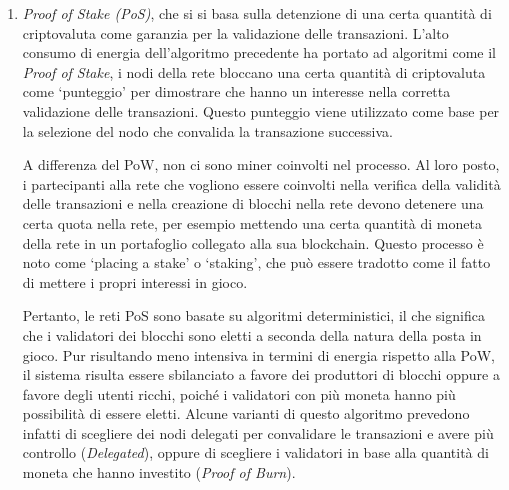 \begin{enumerate}
    \item\textit{{Proof of Stake (PoS)}}, che si si basa sulla detenzione di una certa quantità di criptovaluta come garanzia per la validazione delle transazioni. 
    L'alto consumo di energia dell'algoritmo precedente ha portato ad algoritmi come il \textit{Proof of Stake}, i nodi della rete bloccano una certa quantità di criptovaluta come `punteggio'
    per dimostrare che hanno un interesse nella corretta validazione delle transazioni. 
    Questo punteggio viene utilizzato come base per la selezione del nodo che convalida la transazione successiva. 
    
    A differenza del PoW, non ci sono miner coinvolti nel processo. Al loro posto, i partecipanti alla rete che 
    vogliono essere coinvolti nella verifica della validità delle transazioni e nella creazione di blocchi nella rete 
    devono detenere una certa quota nella rete, per esempio mettendo una certa quantità di moneta della rete in un portafoglio collegato 
    alla sua blockchain. Questo processo è noto come `placing a stake' o `staking', che può essere tradotto come il fatto di mettere i propri interessi in gioco. 
    
    Pertanto, le reti PoS sono basate su algoritmi deterministici, il che significa che i validatori dei blocchi sono eletti a seconda della natura della posta in gioco. 
    Pur risultando meno intensiva in termini di energia rispetto alla PoW, il sistema risulta essere sbilanciato a favore dei produttori di blocchi oppure a favore degli utenti ricchi, 
    poiché i validatori con più moneta hanno più possibilità di essere eletti. 
    Alcune varianti di questo algoritmo prevedono infatti di scegliere dei nodi delegati per convalidare le transazioni e avere più controllo (\textit{Delegated}), 
    oppure di scegliere i validatori in base alla quantità di moneta che hanno investito (\textit{Proof of Burn}).

\end{enumerate}

